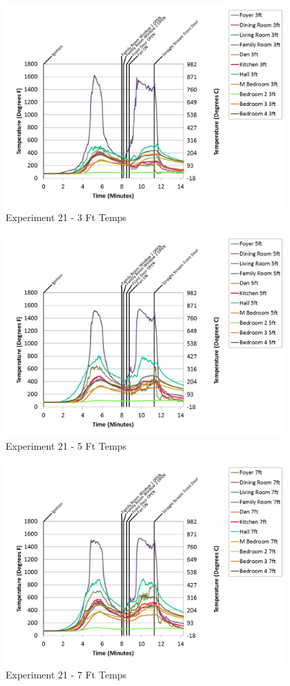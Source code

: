 \documentclass{article}
\begin{document}
\begin{appendices}
	\begin{figure}[h!]
		\centering
		\includegraphics[height=3.05in]{0_Images/Results_Charts/Exp_21_Charts/3FtTemps.pdf}
		\caption{Experiment 21 - 3 Ft Temps}
	\end{figure}
 
	\clearpage

	\begin{figure}[h!]
		\centering
		\includegraphics[height=3.05in]{0_Images/Results_Charts/Exp_21_Charts/5FtTemps.pdf}
		\caption{Experiment 21 - 5 Ft Temps}
	\end{figure}
 

	\begin{figure}[h!]
		\centering
		\includegraphics[height=3.05in]{0_Images/Results_Charts/Exp_21_Charts/7FtTemps.pdf}
		\caption{Experiment 21 - 7 Ft Temps}
	\end{figure}
 

\end{appendices}
\end{document}
